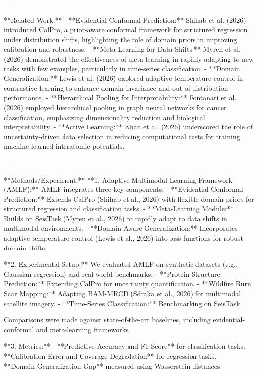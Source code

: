 ---

**Related Work:**  
- **Evidential-Conformal Prediction:** Shihab et al. (2026) introduced CalPro, a prior-aware conformal framework for structured regression under distribution shifts, highlighting the role of domain priors in improving calibration and robustness.  
- **Meta-Learning for Data Shifts:** Myren et al. (2026) demonstrated the effectiveness of meta-learning in rapidly adapting to new tasks with few examples, particularly in time-series classification.  
- **Domain Generalization:** Lewis et al. (2026) explored adaptive temperature control in contrastive learning to enhance domain invariance and out-of-distribution performance.  
- **Hierarchical Pooling for Interpretability:** Fontanari et al. (2026) employed hierarchical pooling in graph neural networks for cancer classification, emphasizing dimensionality reduction and biological interpretability.  
- **Active Learning:** Khan et al. (2026) underscored the role of uncertainty-driven data selection in reducing computational costs for training machine-learned interatomic potentials.

---

**Methods/Experiment:**  
**1. Adaptive Multimodal Learning Framework (AMLF):**  
AMLF integrates three key components:
   - **Evidential-Conformal Prediction:** Extends CalPro (Shihab et al., 2026) with flexible domain priors for structured regression and classification tasks.  
   - **Meta-Learning Module:** Builds on SeisTask (Myren et al., 2026) to rapidly adapt to data shifts in multimodal environments.
   - **Domain-Aware Generalization:** Incorporates adaptive temperature control (Lewis et al., 2026) into loss functions for robust domain shifts.

**2. Experimental Setup:**  
We evaluated AMLF on synthetic datasets (e.g., Gaussian regression) and real-world benchmarks:  
   - **Protein Structure Prediction:** Extending CalPro for uncertainty quantification.  
   - **Wildfire Burn Scar Mapping:** Adapting BAM-MRCD (Sdraka et al., 2026) for multimodal satellite imagery.  
   - **Time-Series Classification:** Benchmarking on SeisTask.  

Comparisons were made against state-of-the-art baselines, including evidential-conformal and meta-learning frameworks.

**3. Metrics:**  
- **Predictive Accuracy and F1 Score** for classification tasks.  
- **Calibration Error and Coverage Degradation** for regression tasks.  
- **Domain Generalization Gap** measured using Wasserstein distances.  

